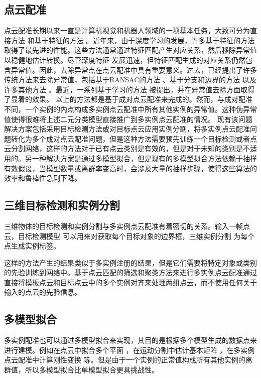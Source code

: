 \subsection{点云配准}
点云配准长期以来一直是计算机视觉和机器人领域的一项基本任务，大致可分为直接方法 \cite{besl1992method, pomerleau2015review} 和基于特征的方法 \cite{qi2017pointnet,huang2021predator,bai2021pointdsc} 。近年来，由于深度学习的发展，许多基于特征的方法取得了最先进的性能。这些方法通常通过特征匹配产生对应关系，然后移除异常值以稳健地估计转换。尽管深度特征 \cite{qi2017pointnet,huang2021predator,bai2021pointdsc, wang2022you} 发展迅速，但特征匹配生成的对应关系仍然包含异常值。因此，去除异常点在点云配准中具有重要意义。过去，已经提出了许多传统方法来去除异常值，包括基于RANSAC的方法 \cite{barath2021progressive,zhao2021progressive,barath2018graph} 、基于分支和边界的方法 \cite{kluger2020consac} 以及许多其他方法 \cite{huang2021predator,yang2020teaser} 。最近，一系列基于学习的方法 \cite{bai2020d3feat,yi2018learning} 被提出，并在异常值去除方面取得了显着的效果。
以上的方法都是基于成对点云配准来完成的。然而，与成对配准不同，一个实例的内点构成多实例点云配准中所有其他实例的异常值。这种伪异常值使得很难将上述二元分类模型直接推广到多实例点云配准的情况。
现有该问题解决方案包括采用目标检测方法或对目标点云应用实例分割，将多实例点云配准问题转化为多个成对点云配准问题，但是这种方法需要预先训练一个目标检测或者点云分割网络，这样的方法对于已有点云类别是有效的，但是对于未知的类别是不适用的。另一种解决方案是通过多模型拟合，但是现有的多模型拟合方法依赖于抽样有效假设，当模型数量或离群率变高时，会涉及大量的抽样步骤，使得这些算法的效率和鲁棒性急剧下降。

\subsection{三维目标检测和实例分割}
三维物体的目标检测和实例分割与多实例点云配准有着密切的关系。输入一帧点云，目标检测模型 \cite{qi2019deep} 可以用来对获取每个目标对象的边界框，三维实例分割 \cite{wang2018sgpn,han2020occuseg} 为每个点生成实例标签。

这样的方法产生的结果类似于多实例注册的结果，但是它们需要将特定对象或类别的先验训练到网络中。基于点云匹配的筛选和聚类方法来进行多实例点云配准通过直接将模板点云和目标点云中的多个实例对齐来处理两组点云，而不使用任何关于输入的点云的先验信息。

\subsection{多模型拟合}
多实例配准也可以通过多模型拟合来实现，其目的是根据多个模型生成的数据点来进行建模。例如在点云中拟合多个平面 \cite{barath2018multi} ，在运动分割中估计基本矩阵 \cite{hartley1997defense} ，在多实例点云配准中计算刚性变换 \cite{tang2022multi} 等。但是由于一个实例的正常值构成所有其他实例的离群值，所以多模型拟合比单模型拟合更具挑战性。

